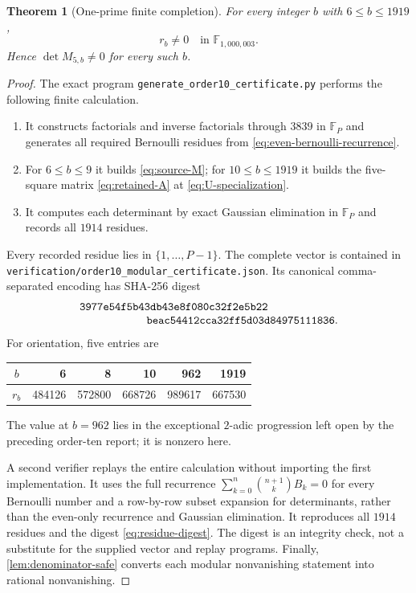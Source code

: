 \documentclass[11pt]{article}
\newtheorem{theorem}{Theorem}[section]
\theoremstyle{definition}
\newcommand{\F}{\mathbb{F}}
\begin{document}
\begin{theorem}[One-prime finite completion]
\label{thm:finite-order-ten}
For every integer $b$ with $6\le b\le1919$,
\begin{equation}
 r_b\ne0\quad\text{in }\F_{1{,}000{,}003}.
 \label{eq:all-residues-nonzero}
\end{equation}
Hence $\det M_{5,b}\ne0$ for every such $b$.
\end{theorem}

\begin{proof}
The exact program \texttt{generate\_order10\_certificate.py} performs
the following finite calculation.

\begin{enumerate}
\item It constructs factorials and inverse factorials through $3839$
in $\F_P$ and generates all required Bernoulli residues from
\eqref{eq:even-bernoulli-recurrence}.
\item For $6\le b\le9$ it builds \eqref{eq:source-M}; for
$10\le b\le1919$ it builds the five-square matrix
\eqref{eq:retained-A} at \eqref{eq:U-specialization}.
\item It computes each determinant by exact Gaussian elimination in
$\F_P$ and records all $1914$ residues.
\end{enumerate}

Every recorded residue lies in $\{1,\ldots,P-1\}$.  The complete vector
is contained in \nolinkurl{verification/order10_modular_certificate.json}.  Its
canonical comma-separated encoding has SHA-256 digest
\begin{equation}
\begin{split}
&\texttt{3977e54f5b43db43e8f080c32f2e5b22}\\[-1mm]
&\hspace{21mm}\texttt{beac54412cca32ff5d03d84975111836}.
\end{split}
\label{eq:residue-digest}
\end{equation}
For orientation, five entries are
\begin{center}
\begin{tabular}{crrrrr}
\toprule
$b$&6&8&10&962&1919\\
\midrule
$r_b$&484126&572800&668726&989617&667530\\
\bottomrule
\end{tabular}
\end{center}
The value at $b=962$ lies in the exceptional $2$-adic progression left
open by the preceding order-ten report; it is nonzero here.

A second verifier replays the entire calculation without importing the
first implementation.  It uses the full recurrence
$\sum_{k=0}^n\binom{n+1}{k}B_k=0$ for every Bernoulli number and a
row-by-row subset expansion for determinants, rather than the even-only
recurrence and Gaussian elimination.  It reproduces all $1914$ residues
and the digest \eqref{eq:residue-digest}.  The digest is an integrity
check, not a substitute for the supplied vector and replay programs.
Finally, \cref{lem:denominator-safe} converts each modular nonvanishing
statement into rational nonvanishing.
\end{proof}
\end{document}
